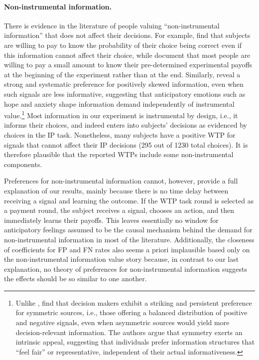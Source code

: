 \documentclass[12pt,a4paper]{article}
\begin{document}
\paragraph{Non-instrumental information.} There is evidence in the literature of people valuing ``non-instrumental information'' that does not affect their decisions. For example, \citet{eliaz_paying_2010} find that subjects are willing to pay to know the probability of their choice being correct even if this information cannot affect their choice, while \citet{ganguly_fantasy_2017} document that most people are willing to pay a small amount to know their pre-determined experimental payoffs at the beginning of the experiment rather than at the end.  Similarly, \citet{Masatlioglu2023} reveal a strong and systematic preference for positively skewed information, even when such signals are less informative, suggesting that anticipatory emotions such as hope and anxiety shape information demand independently of instrumental value.\footnote{Unlike \citet{Masatlioglu2023}, \citet{OliverosZultan2025} find that decision makers exhibit a striking and persistent preference for symmetric sources, i.e., those offering a balanced distribution of positive and negative signals, even when asymmetric sources would yield more decision-relevant information.  The authors argue that symmetry exerts an intrinsic appeal, suggesting that individuals prefer information structures that “feel fair” or representative, independent of their actual informativeness.} 
Most information in our experiment is instrumental by design, i.e., it informs their choices, and indeed enters into subjects' decisions as evidenced by choices in the IP task. Nonetheless, many subjects have a positive WTP for signals that cannot affect their IP decisions (295 out of 1230 total choices). It is therefore plausible that the reported WTPs include some non-instrumental components. 

Preferences for non-instrumental information cannot, however, provide a full explanation of our results, mainly because there is no time delay between receiving a signal and learning the outcome.  If the WTP task round is selected as a payment round, the subject receives a signal, chooses an action, and then immediately learns their payoffs.  This leaves essentially no window for anticipatory feelings assumed to be the causal mechanism behind the demand for non-instrumental information in most of the literature. Additionally, the closeness of coefficients for FP and FN rates also seems a priori implausible based only on the non-instrumental information value story because, in contrast to our last explanation, no theory of preferences for non-instrumental information suggests the effects should be so similar to one another.
\end{document}
